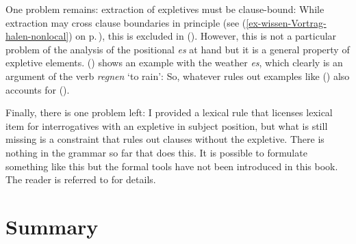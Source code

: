 One problem remains: extraction of expletives must be clause-bound:
\z
While extraction may cross clause boundaries in principle (see
(\ref{ex-wissen-Vortrag-halen-nonlocal}) on p.\,\pageref{ex-wissen-Vortrag-halen-nonlocal}), this is excluded in
(). However, this is not a particular problem of the analysis of the positional \emph{es} at
hand but it is a general property of expletive elements. () shows an example with the weather
\emph{es}, which clearly is an argument of the verb \emph{regnen} `to rain':
\z
So, whatever rules out examples like () also accounts for ().


Finally, there is one problem left: I provided a lexical rule that licenses lexical item for interrogatives with an expletive
in subject position, but what is still missing is a constraint that rules out clauses without the
expletive. There is nothing in the grammar so far that does this. It is possible to formulate
something like this but the formal tools have not been introduced in this book. The reader is
referred to  for details.



\section{Summary}

